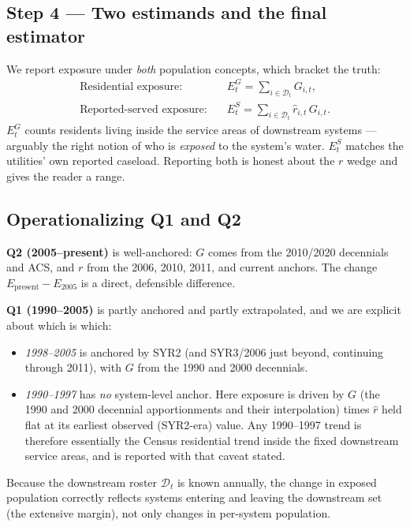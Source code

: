 \documentclass[11pt]{article}
\newcommand{\geopop}{\ensuremath{G}}
\newcommand{\ratio}{\ensuremath{r}}
\begin{document}
\subsection{Step 4 --- Two estimands and the final estimator}
We report exposure under \emph{both} population concepts, which bracket the truth:
\begin{align}
\text{Residential exposure:} &\quad E^{G}_t = \sum_{i\in\mathcal{D}_t}\geopop_{i,t},\\
\text{Reported-served exposure:} &\quad E^{S}_t =
  \sum_{i\in\mathcal{D}_t}\hat{\ratio}_{i,t}\,\geopop_{i,t}.
\end{align}
$E^{G}_t$ counts residents living inside the service areas of downstream systems ---
arguably the right notion of who is \emph{exposed} to the system's water. $E^{S}_t$
matches the utilities' own reported caseload. Reporting both is honest about the
$\ratio$ wedge and gives the reader a range.

\subsection{Operationalizing Q1 and Q2}
\label{sec:q1q2}
\textbf{Q2 (2005--present)} is well-anchored: $\geopop$ comes from the 2010/2020
decennials and ACS, and $\ratio$ from the 2006, 2010, 2011, and current anchors. The
change $E_{\text{present}}-E_{2005}$ is a direct, defensible difference.

\textbf{Q1 (1990--2005)} is partly anchored and partly extrapolated, and we are
explicit about which is which:
\begin{itemize}[leftmargin=2em]
  \item \emph{1998--2005} is anchored by SYR2 (and SYR3/2006 just beyond, continuing
    through 2011), with $\geopop$ from the 1990 and 2000 decennials.
  \item \emph{1990--1997} has \emph{no} system-level anchor. Here exposure is driven
    by $\geopop$ (the 1990 and 2000 decennial apportionments and their interpolation)
    times $\hat{\ratio}$ held flat at its earliest observed (SYR2-era) value. Any
    1990--1997 trend is therefore essentially the Census residential trend inside the
    fixed downstream service areas, and is reported with that caveat stated.
\end{itemize}
Because the downstream roster $\mathcal{D}_t$ is known annually, the change in exposed
population correctly reflects systems entering and leaving the downstream set
(the extensive margin), not only changes in per-system population.
\end{document}
